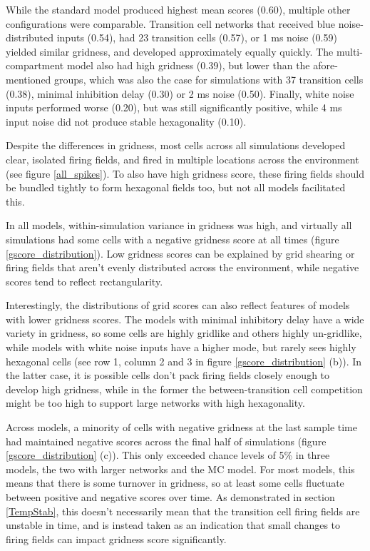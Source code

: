 \documentclass{article}
\begin{document}
    While the standard model produced highest mean scores (0.60), multiple other configurations were comparable. Transition cell networks that received blue noise-distributed inputs (0.54), had 23 transition cells (0.57), or 1 ms noise (0.59) yielded similar gridness, and developed approximately equally quickly. The multi-compartment model also had high gridness (0.39), but lower than the afore-mentioned groups, which was also the case for simulations with 37 transition cells (0.38), minimal inhibition delay (0.30) or 2 ms noise (0.50). Finally, white noise inputs performed worse (0.20), but was still significantly positive, while 4 ms input noise did not produce stable hexagonality (0.10).
    
    Despite the differences in gridness, most cells across all simulations developed clear, isolated firing fields, and fired in multiple locations across the environment (see figure \ref{all_spikes}). To also have high gridness score, these firing fields should be bundled tightly to form hexagonal fields too, but not all models facilitated this.

    In all models, within-simulation variance in gridness was high, and virtually all simulations had some cells with a negative gridness score at all times (figure \ref{gscore_distribution}). Low gridness scores can be explained by grid shearing or firing fields that aren't evenly distributed across the environment, while negative scores tend to reflect rectangularity.

    Interestingly, the distributions of grid scores can also reflect features of models with lower gridness scores. The models with minimal inhibitory delay have a wide variety in gridness, so some cells are highly gridlike and others highly un-gridlike, while models with white noise inputs have a higher mode, but rarely sees highly hexagonal cells (see row 1, column 2 and 3 in figure \ref{gscore_distribution} (b)). In the latter case, it is possible cells don't pack firing fields closely enough to develop high gridness, while in the former the between-transition cell competition might be too high to support large networks with high hexagonality.

    Across models, a minority of cells with negative gridness at the last sample time had maintained negative scores across the final half of simulations (figure \ref{gscore_distribution} (c)). This only exceeded chance levels of 5\% in three models, the two with larger networks and the MC model. For most models, this means that there is some turnover in gridness, so at least some cells fluctuate between positive and negative scores over time. As demonstrated in section \ref{TempStab}, this doesn't necessarily mean that the transition cell firing fields are unstable in time, and is instead taken as an indication that small changes to firing fields can impact gridness score significantly. 
\end{document}
